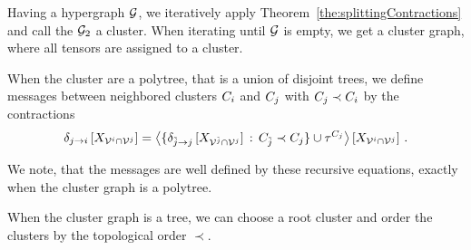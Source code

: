 
Having a hypergraph $\mathcal{G}$, we iteratively apply Theorem~\ref{the:splittingContractions} and call the $\mathcal{G}_2$ a cluster.
When iterating until $\mathcal{G}$ is empty, we get a cluster graph, where all tensors are assigned to a cluster.

When the cluster are a polytree, that is a union of disjoint trees, we define messages between neighbored clusters $C_{i}$ and $C_{j}$ with $C_{j}\prec C_{i}$ by the contractions
\begin{align*}
	\delta_{j \rightarrow i}\left[X_{\mathcal{V}^{i}\cap\mathcal{V}^{j}}\right]
	= \left\langle \{
	\delta_{\tilde{j} \rightarrow j}\left[X_{\mathcal{V}^{\tilde{j}}\cap\mathcal{V}^{j}}\right]
	\, : \, C_{\tilde{j}}\prec C_{j}\} \cup \tau^{C_{j}}\right\rangle \left[ X_{\mathcal{V}^{i}\cap\mathcal{V}^{j}} \right] \, .
\end{align*}



We note, that the messages are well defined by these recursive equations, exactly when the cluster graph is a polytree.

When the cluster graph is a tree, we can choose a root cluster and order the clusters by the topological order $\prec$.


